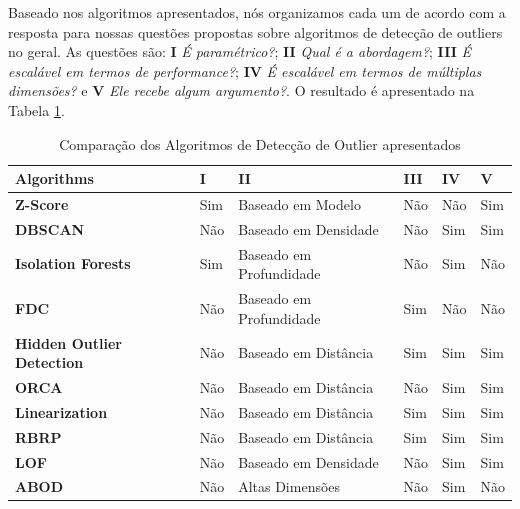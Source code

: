 \vspace{25pt}

Baseado nos algoritmos apresentados, nós organizamos cada um de acordo com a resposta para nossas questões propostas sobre algoritmos de detecção de outliers no geral. As questões são: \textbf{I} \textit{É paramétrico?}; \textbf{II} \textit{Qual é a abordagem?}; \textbf{III} \textit{É escalável em termos de performance?}; \textbf{IV} \textit{É escalável em termos de múltiplas dimensões?} e \textbf{V} \textit{Ele recebe algum argumento?}. O resultado é apresentado na Tabela \ref{table:algorithms-comparison}.

\begin{table}[]
	\centering
	\begin{tabular}{|l|l|l|l|l|l|}
		\hline
		\textbf{Algorithms}               & \textbf{I} & \textbf{II}             & \textbf{III} & \textbf{IV} & \textbf{V} \\ \hline
		\textbf{Z-Score}                  & Sim        & Baseado em Modelo       & Não          & Não         & Sim        \\ \hline
		\textbf{DBSCAN}                   & Não        & Baseado em Densidade    & Não          & Sim         & Sim        \\ \hline
		\textbf{Isolation Forests}        & Sim        & Baseado em Profundidade & Não          & Sim         & Não        \\ \hline
		\textbf{FDC}                      & Não        & Baseado em Profundidade & Sim          & Não         & Não        \\ \hline
		\textbf{Hidden Outlier Detection} & Não        & Baseado em Distância    & Sim          & Sim         & Sim        \\ \hline
		\textbf{ORCA}                     & Não        & Baseado em Distância    & Não          & Sim         & Sim        \\ \hline
		\textbf{Linearization}            & Não        & Baseado em Distância    & Sim          & Sim         & Sim        \\ \hline
		\textbf{RBRP}                     & Não        & Baseado em Distância    & Sim          & Sim         & Sim        \\ \hline
		\textbf{LOF}                      & Não        & Baseado em Densidade    & Não          & Sim         & Sim        \\ \hline
		\textbf{ABOD}                     & Não        & Altas Dimensões         & Não          & Sim         & Não        \\ \hline
	\end{tabular}
	\caption{Comparação dos Algoritmos de Detecção de Outlier apresentados}
	\label{table:algorithms-comparison}
\end{table}

